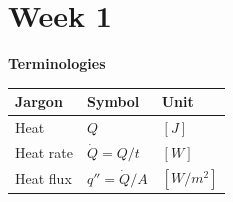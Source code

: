 \section{Week 1}
\textbf{\large Terminologies}
\begin{table}[h]
\begin{tabular}{|l|l|l|}
\hline
\textbf{Jargon} & \textbf{Symbol}    & \textbf{Unit} \\ \hline
Heat            & $Q$                & $[J]$         \\ \hline
Heat rate       & $\dot{Q}=Q/t$      & $[W]$         \\ \hline
Heat flux       & $q''=\dot{Q}/A$ & $[W/m^2]$      \\ \hline
\end{tabular}
\end{table}

